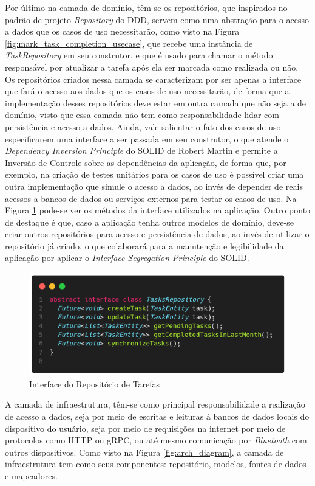 \documentclass[12pt, %
openright, 
oneside, %
a4paper,    %
brazil]{facom-ufu-abntex2}
\begin{document}
Por último na camada de domínio, têm-se os repositórios, que inspirados no padrão de projeto \textit{Repository} do DDD, servem como uma abstração para o acesso a dados que os casos de uso necessitarão, como visto na Figura \ref{fig:mark_task_completion_usecase}, que recebe uma instância de \textit{TaskRepository} em seu construtor, e que é usado para chamar o método responsável por atualizar a tarefa após ela ser marcada como realizada ou não. Os repositórios criados nessa camada se caracterizam por ser apenas a interface que fará o acesso aos dados que os casos de uso necessitarão, de forma que a implementação desses repositórios deve estar em outra camada que não seja a de domínio, visto que essa camada não tem como responsabilidade lidar com persistência e acesso a dados. Ainda, vale salientar o fato dos casos de uso especificarem uma interface a ser passada em seu construtor, o que atende o \textit{Dependency Inversion Principle} do SOLID de Robert Martin e permite a Inversão de Controle sobre as dependências da aplicação, de forma que, por exemplo, na criação de testes unitários para os casos de uso é possível criar uma outra implementação que simule o acesso a dados, ao invés de depender de reais acessos a bancos de dados ou serviços externos para testar os casos de uso. Na Figura \ref{fig:tasks_repository} pode-se ver os métodos da interface utilizados na aplicação. Outro ponto de destaque é que, caso a aplicação tenha outros modelos de domínio, deve-se criar outros repositórios para acesso e persistência de dados, ao invés de utilizar o repositório já criado, o que colaborará para a manutenção e legibilidade da aplicação por aplicar o \textit{Interface Segregation Principle} do SOLID.

\begin{figure}[ht]
    \centering
    \includegraphics[width=.65\textwidth, trim={0 30 0 100}, clip]{figures/arch/tasks_repository.png}
    \caption{Interface do Repositório de Tarefas}
    \label{fig:tasks_repository}
\end{figure}

A camada de infraestrutura, têm-se como principal responsabilidade a realização de acesso a dados, seja por meio de escritas e leituras à bancos de dados locais do dispositivo do usuário, seja por meio de requisições na internet por meio de protocolos como HTTP ou gRPC, ou até mesmo comunicação por \textit{Bluetooth} com outros dispositivos. Como visto na Figura \ref{fig:arch_diagram}, a camada de infraestrutura tem como seus componentes: repositório, modelos, fontes de dados e mapeadores.
\end{document}
